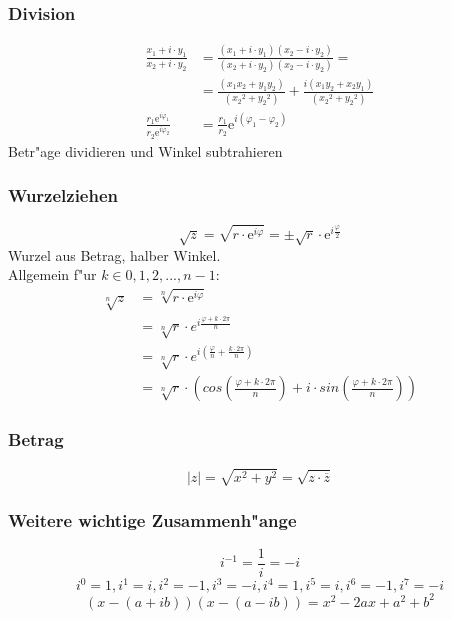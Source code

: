 \documentclass[10pt,a4paper,landscape]{article}
\begin{document}
\begin{multicols*}{3}
		\subsubsection{Division}
		\begin{align*}
		\frac{x_1 + i \cdot y_1}{x_2 + i \cdot y_2}                   & = \frac{(x_1 + i \cdot y_1)(x_2 - i \cdot y_2)}{(x_2 + i \cdot y_2)(x_2 - i \cdot y_2)} =           \\
		& = \frac{(x_1x_2 + y_1y_2)}{({x_2}^2 + {y_2}^2)} + \frac{ i (x_1y_2 + x_2y_1) }{({x_2}^2 + {y_2}^2)} \\
		\frac{r_1\mathrm{e}^{i\varphi_1}}{r_2\mathrm{e}^{i\varphi_2}} & = \frac{r_1}{r_2}\mathrm{e}^{i(\varphi_1-\varphi_2)}                                                
		\end{align*}
		Betr"age dividieren und Winkel subtrahieren
		\subsubsection{Wurzelziehen}
		\[ \sqrt{z} = \sqrt{r \cdot \mathrm{e}^{i\varphi}} = \pm \sqrt{r} \cdot \mathrm{e}^{i \frac{\varphi}{2}} \]
		Wurzel aus Betrag, halber Winkel.\\
		Allgemein f"ur $k \in {0, 1, 2, ..., n-1}$:
		\begin{align*}
		\sqrt[n]{z} & = \sqrt[n]{r \cdot \mathrm{e}^{i\varphi}}                                                                   \\
		& = \sqrt[n]{r} \cdot e^{i \frac{\varphi + k \cdot 2\pi}{n}}                                                  \\
		& = \sqrt[n]{r} \cdot e^{i (\frac{\varphi}{n} + \frac{k \cdot 2\pi}{n})}                                      \\
		& = \sqrt[n]{r} \cdot (cos(\frac{\varphi + k \cdot 2\pi}{n}) + i \cdot sin(\frac{\varphi + k \cdot 2\pi}{n})) 
		\end{align*}
		
		\subsubsection{Betrag}
		\[ |z| = \sqrt{x^2 + y^2} = \sqrt{z \cdot \overline{z}}  \]
		
		\subsubsection{Weitere wichtige Zusammenh"ange}
		\[ i^{-1} = \frac{1}{i} = -i \]
		\[ i^0 = 1, i^1 = i, i^2 = -1, i^3 = -i, i^4 = 1, i^5 = i, i^6 = -1, i^7 = -i  \]
		\[ (x-(a+ib))(x-(a-ib)) = x^2-2ax+a^2+b^2 \]
		

\end{multicols*}
\end{document}
